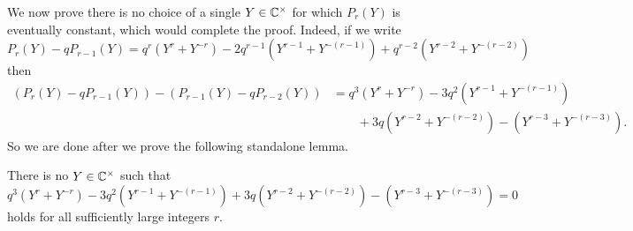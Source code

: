We now prove there is no choice of a single $Y \in \mathbb C^\times$ for which
$P_r(Y)$ is eventually constant, which would complete the proof.
Indeed, if we write
\[
  P_r(Y) - q P_{r-1}(Y)
  = q^r(Y^r + Y^{-r}) - 2q^{r-1} (Y^{r-1} + Y^{-(r-1)}) + q^{r-2}(Y^{r-2} + Y^{-(r-2)})
\]
then
\begin{align*}
  (P_r(Y) - q P_{r-1}(Y)) - (P_{r-1}(Y) - q P_{r-2}(Y))
  &= q^3(Y^r + Y^{-r}) - 3q^2(Y^{r-1} + Y^{-(r-1)}) \\
  &\qquad + 3q(Y^{r-2} + Y^{-(r-2)}) - (Y^{r-3} + Y^{-(r-3)}).
\end{align*}
So we are done after we prove the following standalone lemma.
\begin{lemma}
  There is no $Y \in \mathbb C^\times$ such that
  \[ q^3(Y^r + Y^{-r}) - 3q^2(Y^{r-1} + Y^{-(r-1)})
    + 3q(Y^{r-2} + Y^{-(r-2)}) - (Y^{r-3} + Y^{-(r-3)}) = 0 \]
  holds for all sufficiently large integers $r$.
\end{lemma}
